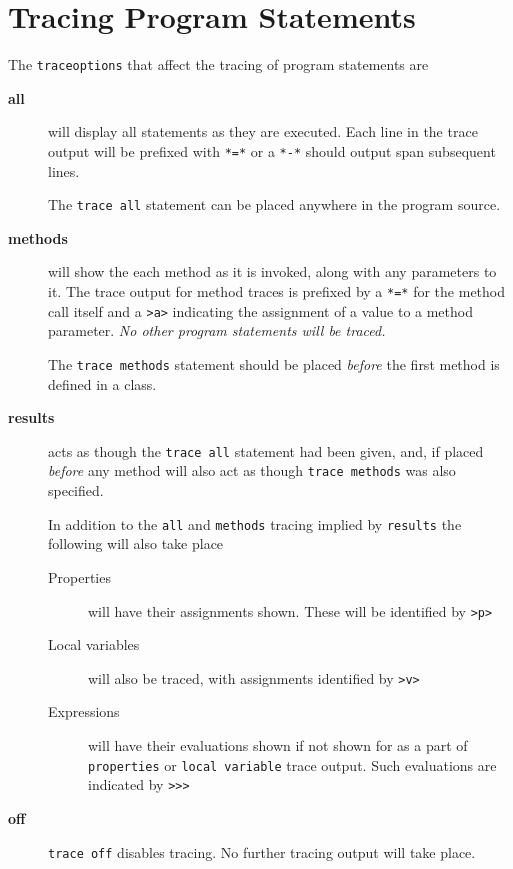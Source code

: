 \section{Tracing Program Statements}
The \texttt{traceoptions} that affect the tracing of program statements are
\begin{description}
\item[\textbf{all}] will display all statements as they are executed. Each line in the trace output will be prefixed with \texttt{*=*} or a \texttt{*-*} should output span subsequent lines.

The \texttt{trace all} statement can be placed anywhere in the program source. 

\item[\textbf{methods}] will show the each method as it is invoked, along with any parameters to it. The trace output for method traces is prefixed by a \texttt{*=*} for the method call itself and a \texttt{>a>} indicating the assignment of a value to a method parameter. \textit{No other program statements will be traced.}

The \texttt{trace methods} statement should be placed \textit{before} the first method is defined in a class.

\item[\textbf{results}] acts as though the \texttt{trace all} statement had been given, and, if placed \textit{before} any method will also act as though \texttt{trace methods} was also specified.

In addition to the \texttt{all} and \texttt{methods} tracing implied by \texttt{results} the following will also take place
\begin{description}

\item[Properties] will have their assignments shown. These will be identified by \texttt{>p>}

\item[Local variables] will also be traced, with assignments identified by \texttt{>v>}

\item[Expressions] will have their evaluations shown if not shown for as a part of \texttt{properties} or \texttt{local variable} trace output. Such evaluations are indicated by \texttt{>>>}
\end{description}
\item[\textbf{off}] \texttt{trace off} disables tracing. No further tracing output will take place.
\end{description} 


